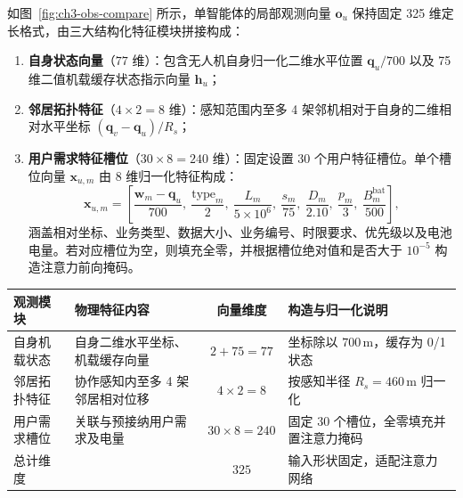 如图~\ref{fig:ch3-obs-compare} 所示，单智能体的局部观测向量 $\mathbf o_u$ 保持固定 325 维定长格式，由三大结构化特征模块拼接构成：
\begin{enumerate}
    \item \textbf{自身状态向量}（$77$ 维）：包含无人机自身归一化二维水平位置 $\mathbf q_u / 700$ 以及 75 维二值机载缓存状态指示向量 $\mathbf h_u$；
    \item \textbf{邻居拓扑特征}（$4\times 2 = 8$ 维）：感知范围内至多 4 架邻机相对于自身的二维相对水平坐标 $(\mathbf q_v - \mathbf q_u) / R_s$；
    \item \textbf{用户需求特征槽位}（$30\times 8 = 240$ 维）：固定设置 30 个用户特征槽位。单个槽位向量 $\mathbf x_{u,m}$ 由 8 维归一化特征构成：
    \begin{equation}
        \mathbf x_{u,m} = \left[
        \frac{\mathbf w_m - \mathbf q_u}{700}, \
        \frac{\mathrm{type}_m}{2}, \
        \frac{L_m}{5\times 10^6}, \
        \frac{s_m}{75}, \
        \frac{D_m}{2.10}, \
        \frac{p_m}{3}, \
        \frac{B_m^{\mathrm{bat}}}{500}
        \right],
        \label{eq:ch3-ue-slot}
    \end{equation}
    涵盖相对坐标、业务类型、数据大小、业务编号、时限要求、优先级以及电池电量。若对应槽位为空，则填充全零，并根据槽位绝对值和是否大于 $10^{-5}$ 构造注意力前向掩码。
\end{enumerate}

\begin{table}[!htbp]
    \centering
    \label{tab:ch3-observation}
    \footnotesize
    \begin{tabularx}{\textwidth}{lXcX}
        \toprule
        观测模块 & 物理特征内容 & 向量维度 & 构造与归一化说明 \\
        \midrule
        自身机载状态 & 自身二维水平坐标、机载缓存向量 & $2 + 75 = 77$ & 坐标除以 $700\,\mathrm{m}$，缓存为 0/1 状态 \\
        邻居拓扑特征 & 协作感知内至多 4 架邻居相对位移 & $4\times 2 = 8$ & 按感知半径 $R_s=460\,\mathrm{m}$ 归一化 \\
        用户需求槽位 & 关联与预接纳用户需求及电量 & $30\times 8 = 240$ & 固定 30 个槽位，全零填充并置注意力掩码 \\
        \midrule
        总计维度 &  & $325$ & 输入形状固定，适配注意力网络 \\
        \bottomrule
    \end{tabularx}
\end{table}


